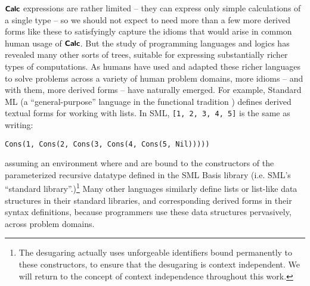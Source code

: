 $\textsf{\textbf{\small Calc}}$ expressions are rather limited -- they can express only simple calculations of a single type -- so we should not expect to need more than a few more derived forms like these to satisfyingly capture the  idioms that would arise in common human usage of $\textsf{\textbf{\small Calc}}$. %
But the study of programming languages and logics has revealed many other sorts of trees, suitable for expressing substantially richer types of computations.  As humans have used and adapted these richer languages to solve problems across a variety of human problem domains, more idioms -- and with them, more derived forms -- have naturally emerged.  For example, Standard ML (a ``general-purpose''  language in the functional tradition \cite{mthm97-for-dart,harper1997programming}) defines derived textual forms for working with lists. In SML, \lstinline{[1, 2, 3, 4, 5]} is the same as writing: 
\begin{lstlisting}[numbers=none]
Cons(1, Cons(2, Cons(3, Cons(4, Cons(5, Nil)))))
\end{lstlisting}
assuming an environment where  and  are bound to the constructors of the parameterized recursive datatype  defined in the SML Basis library (i.e. SML's ``standard library''.)\footnote{The desugaring actually uses unforgeable identifiers bound permanently to these constructors, to ensure that the desugaring is context independent. We will return to the concept of context independence throughout this work.} Many other languages similarly define lists or list-like data structures in their standard libraries, and corresponding derived forms in their syntax definitions, because programmers use these data structures pervasively, across problem domains.

